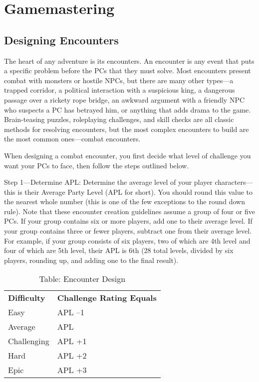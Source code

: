 \chapter{Gamemastering}
\section{Designing Encounters}

\label{f0}				
The heart of any adventure is its encounters. An encounter is any event that puts a specific problem before the PCs that they must solve. Most encounters present combat with monsters or hostile NPCs, but there are many other types---a trapped corridor, a political interaction with a suspicious king, a dangerous passage over a rickety rope bridge, an awkward argument with a friendly NPC who suspects a PC has betrayed him, or anything that adds drama to the game. Brain-teasing puzzles, roleplaying challenges, and skill checks are all classic methods for resolving encounters, but the most complex encounters to build are the most common ones---combat encounters.
				
When designing a combat encounter, you first decide what level of challenge you want your PCs to face, then follow the steps outlined below.
				
Step 1---Determine APL: Determine the average level of your player characters---this is their Average Party Level (APL for short). You should round this value to the nearest whole number (this is one of the few exceptions to the round down rule). Note that these encounter creation guidelines assume a group of four or five PCs. If your group contains six or more players, add one to their average level. If your group contains three or fewer players, subtract one from their average level. For example, if your group consists of six players, two of which are 4th level and four of which are 5th level, their APL is 6th (28 total levels, divided by six players, rounding up, and adding one to the final result).

\begin{table}[]
\sffamily
\caption{Table: Encounter Design}
\begin{tabular}{ll}
\textbf{Difficulty} & \textbf{Challenge Rating Equals}\\
Easy & APL –1 \\
 Average & APL \\
 Challenging & APL +1 \\
 Hard & APL +2 \\
 Epic & APL +3 \\
\end{tabular}
\end{table}

